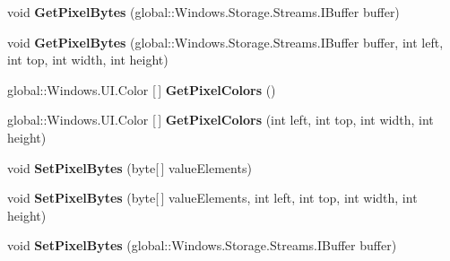 \begin{DoxyCompactItemize}
\item 
\mbox{\label{interface_microsoft_1_1_graphics_1_1_canvas_1_1_i_canvas_bitmap_a36158bf3dac9d5cdb9a1a41a7fc3708d}} 
void {\bfseries Get\+Pixel\+Bytes} (global\+::\+Windows.\+Storage.\+Streams.\+I\+Buffer buffer)
\item 
\mbox{\label{interface_microsoft_1_1_graphics_1_1_canvas_1_1_i_canvas_bitmap_a6854e3ad20296f41992100acc94e6bdb}} 
void {\bfseries Get\+Pixel\+Bytes} (global\+::\+Windows.\+Storage.\+Streams.\+I\+Buffer buffer, int left, int top, int width, int height)
\item 
\mbox{\label{interface_microsoft_1_1_graphics_1_1_canvas_1_1_i_canvas_bitmap_ad6aeb3bf7ad3092e46d6a3133472b1d1}} 
global\+::\+Windows.\+U\+I.\+Color \mbox{[}$\,$\mbox{]} {\bfseries Get\+Pixel\+Colors} ()
\item 
\mbox{\label{interface_microsoft_1_1_graphics_1_1_canvas_1_1_i_canvas_bitmap_ac162dc28f7d3a5de4034936d417c24e5}} 
global\+::\+Windows.\+U\+I.\+Color \mbox{[}$\,$\mbox{]} {\bfseries Get\+Pixel\+Colors} (int left, int top, int width, int height)
\item 
\mbox{\label{interface_microsoft_1_1_graphics_1_1_canvas_1_1_i_canvas_bitmap_a811bec820a040dca5292270d03b6431f}} 
void {\bfseries Set\+Pixel\+Bytes} (byte\mbox{[}$\,$\mbox{]} value\+Elements)
\item 
\mbox{\label{interface_microsoft_1_1_graphics_1_1_canvas_1_1_i_canvas_bitmap_af373b13151ccbea6a489af0b71c86b6d}} 
void {\bfseries Set\+Pixel\+Bytes} (byte\mbox{[}$\,$\mbox{]} value\+Elements, int left, int top, int width, int height)
\item 
\mbox{\label{interface_microsoft_1_1_graphics_1_1_canvas_1_1_i_canvas_bitmap_a21c32cb7fb31c8fd6a1decdcb79876d2}} 
void {\bfseries Set\+Pixel\+Bytes} (global\+::\+Windows.\+Storage.\+Streams.\+I\+Buffer buffer)

\end{DoxyCompactItemize}
